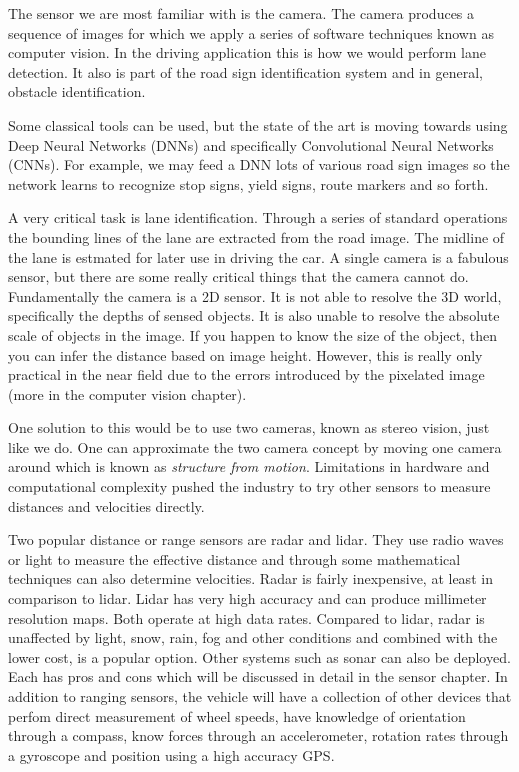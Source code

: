 The sensor we are most familiar with is the camera. The camera produces
a sequence of images for which we apply a series of software techniques
known as computer vision. In the driving application this is how we
would perform lane detection. It also is part of the road sign
identification system and in general, obstacle identification.

Some classical tools can be used, but the state of the art is moving
towards using Deep Neural Networks (DNNs) and specifically Convolutional
Neural Networks (CNNs). For example, we may feed a DNN lots of various
road sign images so the network learns to recognize stop signs, yield
signs, route markers and so forth.

A very critical task is lane identification. Through a series of
standard operations the bounding lines of the lane are extracted from
the road image. The midline of the lane is estmated for later use in
driving the car. A single camera is a fabulous sensor, but there are
some really critical things that the camera cannot do. Fundamentally the
camera is a 2D sensor. It is not able to resolve the 3D world,
specifically the depths of sensed objects. It is also unable to resolve
the absolute scale of objects in the image. If you happen to know the
size of the object, then you can infer the distance based on image
height. However, this is really only practical in the near field due to
the errors introduced by the pixelated image (more in the computer
vision chapter).

One solution to this would be to use two cameras, known as stereo
vision, just like we do. One can approximate the two camera concept by
moving one camera around which is known as \emph{structure from motion}.
Limitations in hardware and computational complexity pushed the industry
to try other sensors to measure distances and velocities directly.

Two popular distance or range sensors are radar and lidar. They use
radio waves or light to measure the effective distance and through some
mathematical techniques can also determine velocities. Radar is fairly
inexpensive, at least in comparison to lidar. Lidar has very high
accuracy and can produce millimeter resolution maps. Both operate at
high data rates. Compared to lidar, radar is unaffected by light, snow,
rain, fog and other conditions and combined with the lower cost, is a
popular option. Other systems such as sonar can also be deployed. Each
has pros and cons which will be discussed in detail in the sensor
chapter. In addition to ranging sensors, the vehicle will have a
collection of other devices that perfom direct measurement of wheel
speeds, have knowledge of orientation through a compass, know forces
through an accelerometer, rotation rates through a gyroscope and
position using a high accuracy GPS.

